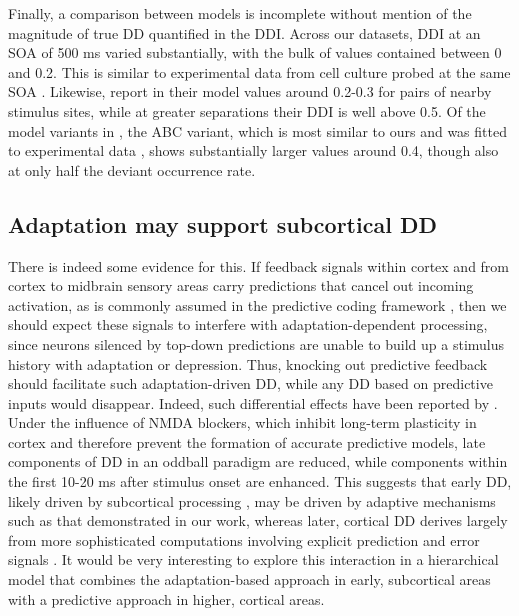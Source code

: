 \documentclass[9pt,lineno,onehalfspacing]{elife}
\begin{document}
Finally, a comparison between models is incomplete without mention of the magnitude of true DD quantified in the DDI. Across our datasets, DDI at an SOA of 500 ms varied substantially, with the bulk of values contained between 0 and 0.2. This is similar to experimental data from cell culture probed at the same SOA \citep{Kubota2021-dx}. Likewise, \cite{Yarden2017-eh} report in their model values around 0.2-0.3 for pairs of nearby stimulus sites, while at greater separations their DDI is well above 0.5. Of the model variants in \cite{Mill2011-ah}, the ABC variant, which is most similar to ours and was fitted to experimental data \citep{Von_der_Behrens2009-cp}, shows substantially larger values around 0.4, though also at only half the deviant occurrence rate.

\subsection{Adaptation may support subcortical DD}

There is indeed some evidence for this. If feedback signals within cortex and from cortex to midbrain sensory areas carry predictions that cancel out incoming activation, as is commonly assumed in the predictive coding framework \citep{Rao1999-xc, Friston2005-jz, Carbajal2018-sd}, then we should expect these signals to interfere with adaptation-dependent processing, since neurons silenced by top-down predictions are unable to build up a stimulus history with adaptation or depression. Thus, knocking out predictive feedback should facilitate such adaptation-driven DD, while any DD based on predictive inputs would disappear. Indeed, such differential effects have been reported by \cite{Harms2018-bg}. Under the influence of NMDA blockers, which inhibit long-term plasticity in cortex and therefore prevent the formation of accurate predictive models, late components of DD in an oddball paradigm are reduced, while components within the first 10-20 ms after stimulus onset are enhanced. This suggests that early DD, likely driven by subcortical processing \citep{Grimm2012-tb, Parras2017-fp}, may be driven by adaptive mechanisms such as that demonstrated in our work, whereas later, cortical DD derives largely from more sophisticated computations involving explicit prediction and error signals \citep{Schlossmacher2022-zv, Grimm2016-fr}. It would be very interesting to explore this interaction in a hierarchical model that combines the adaptation-based approach in early, subcortical areas with a predictive approach \citep{Wacongne2012-ah, Wacongne2016-ht, Hertag2020-kc} in higher, cortical areas. 
\end{document}
